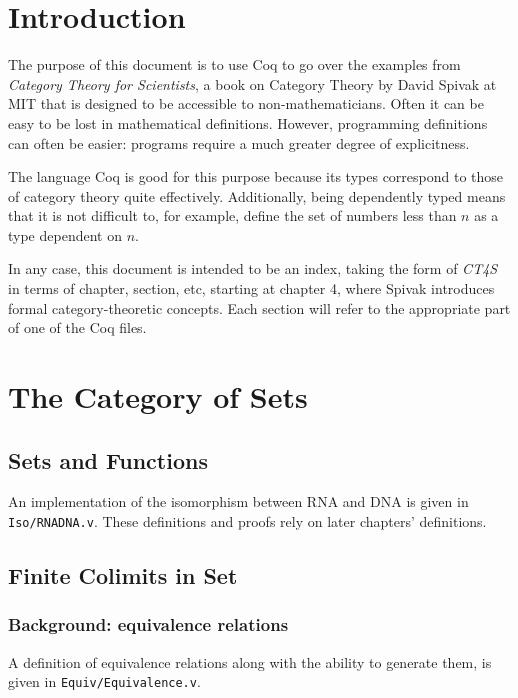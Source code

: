\documentclass[12pt,twocolumn,oneside]{book}
\begin{document}
\setcounter{secnumdepth}{5}

\newcommand{\see}[2]{
        See \texttt{#1}, the line starting with \texttt{#2}.
    }
\newcommand{\reference}[4]{
        #1{#2} \see{#3}{#4}
    }

\chapter*{Introduction}

The purpose of this document is to use Coq to go over the examples from
\emph{Category Theory for Scientists}, a book on Category Theory by David
Spivak at MIT that is designed to be accessible to non-mathematicians. Often it
can be easy to be lost in mathematical definitions. However, programming definitions
can often be easier: programs require a much greater degree of explicitness.

The language Coq is good for this purpose because its types correspond to those
of category theory quite effectively. Additionally, being dependently typed means
that it is not difficult to, for example, define the set of numbers less than $n$
as a type dependent on $n$.

In any case, this document is intended to be an index, taking the form of \emph{CT4S}
in terms of chapter, section, etc, starting at chapter 4, where Spivak introduces
formal category-theoretic concepts. Each section will refer to the appropriate
part of one of the Coq files.

\setcounter{chapter}{1}
\chapter{The Category of Sets}
\section{Sets and Functions}
An implementation of the isomorphism between RNA and DNA is given in \texttt{Iso/RNADNA.v}. These
definitions and proofs rely on later chapters' definitions.

\setcounter{section}{5}
\section{Finite Colimits in \textbf{Set}}
\subsection{Background: equivalence relations}
A definition of equivalence relations along with the ability to generate them, is given in \texttt{Equiv/Equivalence.v}.
\end{document}
